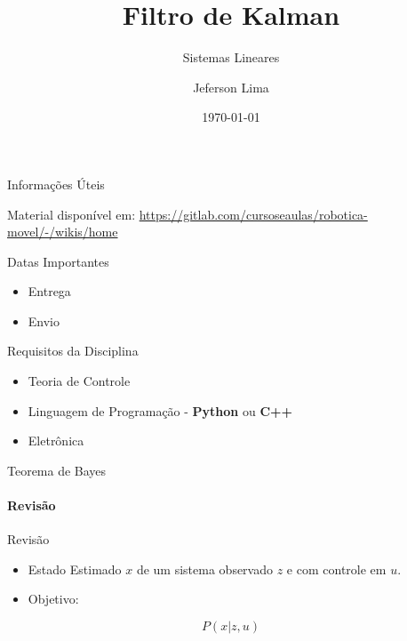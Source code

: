 \documentclass{beamer}
\title{Filtro de Kalman}
\subtitle{Sistemas Lineares}
\date{\today}
\author{Jeferson Lima}
\institute{\url{http://gitlab.com/jeferson.lima}}
\newcommand{\pausar}{\pause}
\begin{document}
\maketitle

\begin{frame}{Informações Úteis}
	\begin{block}{Material disponível em:}
		\href{Robótica Móvel - Wiki}{https://gitlab.com/cursoseaulas/robotica-movel/-/wikis/home}
	\end{block}
	\pausar
	\begin{block}{Datas Importantes}
		\begin{itemize}
		\item Entrega
		\item Envio
		\end{itemize}
	\end{block}
	\pausar
	\begin{block}{Requisitos da Disciplina}
		\begin{itemize}
		\item Teoria de Controle
		\item Linguagem de Programação - \textbf{Python} ou \textbf{C++}
		\item Eletrônica
		\end{itemize}
	\end{block}
\end{frame}


\begin{frame}{Teorema de Bayes}
    \framesubtitle{Revisão} {Revisão}
  \begin{itemize}
    \item Estado Estimado $x$ de um sistema observado $z$ e com controle em $u$.
    \item Objetivo:
  \end{itemize}

  \begin{equation}
    P(x|z,u)
  \end{equation}
\end{frame}
\end{document}
